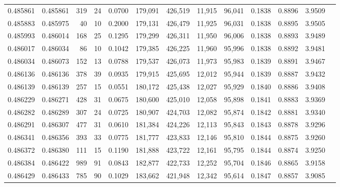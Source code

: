\begin{tabular}{rrrrrrrrrrrrr}
0.485861 & 0.485861 &   319 &    24 &                                     0.0700 & 179,091 & 426,519 &  11,915 &  96,041 & 0.1838 & 0.8896 & 3.9509 \\
0.485883 & 0.485975 &    40 &    10 &                                     0.2000 & 179,131 & 426,479 &  11,925 &  96,031 & 0.1838 & 0.8895 & 3.9505 \\
0.485993 & 0.486014 &   168 &    25 &                                     0.1295 & 179,299 & 426,311 &  11,950 &  96,006 & 0.1838 & 0.8893 & 3.9489 \\
0.486017 & 0.486034 &    86 &    10 &                                     0.1042 & 179,385 & 426,225 &  11,960 &  95,996 & 0.1838 & 0.8892 & 3.9481 \\
0.486034 & 0.486073 &   152 &    13 &                                     0.0788 & 179,537 & 426,073 &  11,973 &  95,983 & 0.1839 & 0.8891 & 3.9467 \\
0.486136 & 0.486136 &   378 &    39 &                                     0.0935 & 179,915 & 425,695 &  12,012 &  95,944 & 0.1839 & 0.8887 & 3.9432 \\
0.486139 & 0.486139 &   257 &    15 &                                     0.0551 & 180,172 & 425,438 &  12,027 &  95,929 & 0.1840 & 0.8886 & 3.9408 \\
0.486229 & 0.486271 &   428 &    31 &                                     0.0675 & 180,600 & 425,010 &  12,058 &  95,898 & 0.1841 & 0.8883 & 3.9369 \\
0.486282 & 0.486289 &   307 &    24 &                                     0.0725 & 180,907 & 424,703 &  12,082 &  95,874 & 0.1842 & 0.8881 & 3.9340 \\
0.486291 & 0.486307 &   477 &    31 &                                     0.0610 & 181,384 & 424,226 &  12,113 &  95,843 & 0.1843 & 0.8878 & 3.9296 \\
0.486341 & 0.486356 &   393 &    33 &                                     0.0775 & 181,777 & 423,833 &  12,146 &  95,810 & 0.1844 & 0.8875 & 3.9260 \\
0.486372 & 0.486380 &   111 &    15 &                                     0.1190 & 181,888 & 423,722 &  12,161 &  95,795 & 0.1844 & 0.8874 & 3.9250 \\
0.486384 & 0.486422 &   989 &    91 &                                     0.0843 & 182,877 & 422,733 &  12,252 &  95,704 & 0.1846 & 0.8865 & 3.9158 \\
0.486429 & 0.486433 &   785 &    90 &                                     0.1029 & 183,662 & 421,948 &  12,342 &  95,614 & 0.1847 & 0.8857 & 3.9085 \\

\end{tabular}
